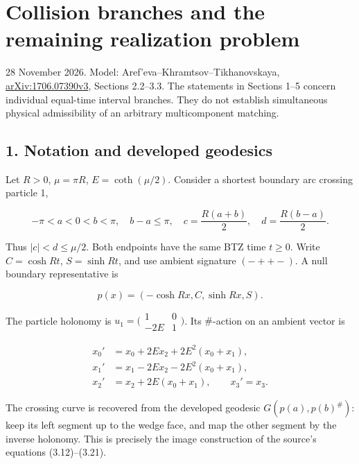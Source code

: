 \documentclass[11pt]{article}
\begin{document}
\clearpage

\section{Collision branches and the remaining realization
problem}\label{collision-branches-and-the-remaining-realization-problem}

28 November 2026. Model: Aref'eva--Khramtsov--Tikhanovskaya,
\href{https://arxiv.org/abs/1706.07390}{arXiv:1706.07390v3}, Sections
2.2--3.3. The statements in Sections 1--5 concern individual equal-time
interval branches. They do not establish simultaneous physical
admissibility of an arbitrary multicomponent matching.

\subsection{1. Notation and developed
geodesics}\label{notation-and-developed-geodesics}

Let \(R>0\), \(\mu=\pi R\), \(E=\coth(\mu/2)\). Consider a shortest
boundary arc crossing particle 1,

\[
 -\pi<a<0<b<\pi,\quad b-a\le\pi,
 \quad c=\frac{R(a+b)}2,\quad d=\frac{R(b-a)}2.
\]

Thus \(|c|<d\le\mu/2\). Both endpoints have the same BTZ time \(t\ge0\).
Write \(C=\cosh Rt\), \(S=\sinh Rt\), and use ambient signature
\((-++-)\). A null boundary representative is

\[
 p(x)=(-\cosh Rx,C,\sinh Rx,S).
\]

The particle holonomy is \(u_1=\bigl(\begin{smallmatrix}1&0\\-2E&1
\end{smallmatrix}\bigr)\). Its \(\#\)-action on an ambient vector is

\[
 \begin{aligned}
 x_0'&=x_0+2Ex_2+2E^2(x_0+x_1),\\
 x_1'&=x_1-2Ex_2-2E^2(x_0+x_1),\\
 x_2'&=x_2+2E(x_0+x_1),\qquad x_3'=x_3.
 \end{aligned}
\]

The crossing curve is recovered from the developed geodesic
\(G(p(a),p(b)^\#)\): keep its left segment up to the wedge face, and map
the other segment by the inverse holonomy. This is precisely the image
construction of the source's equations (3.12)--(3.21).
\end{document}
